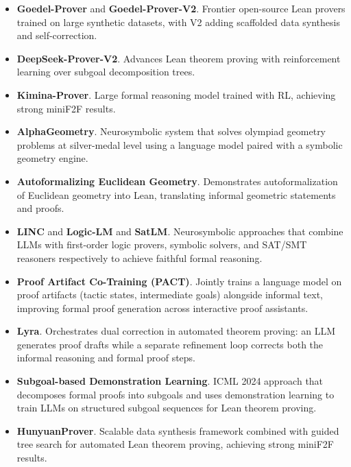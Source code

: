 \documentclass[natbib=false,acmsmall,nonacm,11pt]{acmart}
\begin{document}
\begin{itemize}
\item \textbf{Goedel-Prover} and \textbf{Goedel-Prover-V2}. Frontier open-source Lean provers trained on large synthetic datasets, with V2 adding scaffolded data synthesis and self-correction.~\cite{DBLP:journals/corr/abs-2502-07640,DBLP:journals/corr/abs-2508-03613}
\item \textbf{DeepSeek-Prover-V2}. Advances Lean theorem proving with reinforcement learning over subgoal decomposition trees.~\cite{DBLP:journals/corr/abs-2504-21801}
\item \textbf{Kimina-Prover}. Large formal reasoning model trained with RL, achieving strong miniF2F results.~\cite{DBLP:journals/corr/abs-2504-11354}
\item \textbf{AlphaGeometry}. Neurosymbolic system that solves olympiad geometry problems at silver-medal level using a language model paired with a symbolic geometry engine.~\cite{DBLP:journals/nature/TrinhWLHL24}
\item \textbf{Autoformalizing Euclidean Geometry}. Demonstrates autoformalization of Euclidean geometry into Lean, translating informal geometric statements and proofs.~\cite{DBLP:conf/icml/MurphyYSLAS24}
\item \textbf{LINC} and \textbf{Logic-LM} and \textbf{SatLM}. Neurosymbolic approaches that combine LLMs with first-order logic provers, symbolic solvers, and SAT/SMT reasoners respectively to achieve faithful formal reasoning.~\cite{DBLP:conf/emnlp/OlaussonGLZSTL23,DBLP:conf/emnlp/PanAWW23,DBLP:conf/nips/YeCDD23}
\item \textbf{Proof Artifact Co-Training (PACT)}. Jointly trains a language model on proof artifacts (tactic states, intermediate goals) alongside informal text, improving formal proof generation across interactive proof assistants.~\cite{DBLP:conf/iclr/HanRWAP22}
\item \textbf{Lyra}. Orchestrates dual correction in automated theorem proving: an LLM generates proof drafts while a separate refinement loop corrects both the informal reasoning and formal proof steps.~\cite{DBLP:journals/corr/abs-2309-15806}
\item \textbf{Subgoal-based Demonstration Learning}. ICML 2024 approach that decomposes formal proofs into subgoals and uses demonstration learning to train LLMs on structured subgoal sequences for Lean theorem proving.~\cite{DBLP:conf/icml/ZhaoLK24}
\item \textbf{HunyuanProver}. Scalable data synthesis framework combined with guided tree search for automated Lean theorem proving, achieving strong miniF2F results.~\cite{DBLP:journals/corr/abs-2412-20735}

\end{itemize}
\end{document}
